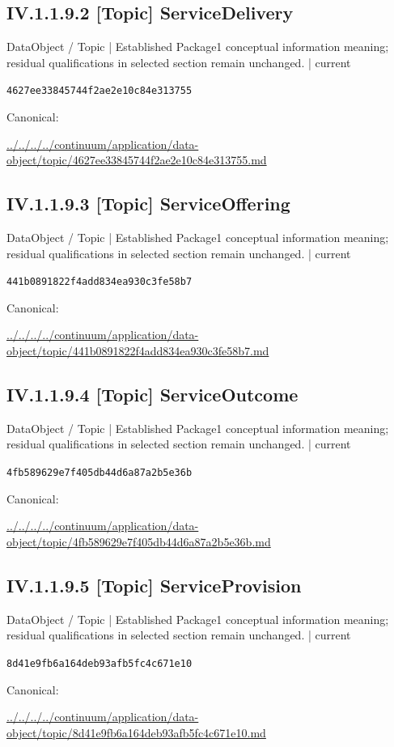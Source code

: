 \documentclass[10pt,a4paper]{article}
\begin{document}
\subsection*{IV.1.1.9.2 [Topic] ServiceDelivery}
{\small DataObject / Topic | Established Package1 conceptual information meaning; residual qualifications in selected section remain unchanged. | current}\par
\texttt{4627ee33845744f2ae2e10c84e313755}\par
Canonical: \par
{\footnotesize\url{../../../../continuum/application/data-object/topic/4627ee33845744f2ae2e10c84e313755.md}}\par
\subsection*{IV.1.1.9.3 [Topic] ServiceOffering}
{\small DataObject / Topic | Established Package1 conceptual information meaning; residual qualifications in selected section remain unchanged. | current}\par
\texttt{441b0891822f4add834ea930c3fe58b7}\par
Canonical: \par
{\footnotesize\url{../../../../continuum/application/data-object/topic/441b0891822f4add834ea930c3fe58b7.md}}\par
\subsection*{IV.1.1.9.4 [Topic] ServiceOutcome}
{\small DataObject / Topic | Established Package1 conceptual information meaning; residual qualifications in selected section remain unchanged. | current}\par
\texttt{4fb589629e7f405db44d6a87a2b5e36b}\par
Canonical: \par
{\footnotesize\url{../../../../continuum/application/data-object/topic/4fb589629e7f405db44d6a87a2b5e36b.md}}\par
\subsection*{IV.1.1.9.5 [Topic] ServiceProvision}
{\small DataObject / Topic | Established Package1 conceptual information meaning; residual qualifications in selected section remain unchanged. | current}\par
\texttt{8d41e9fb6a164deb93afb5fc4c671e10}\par
Canonical: \par
{\footnotesize\url{../../../../continuum/application/data-object/topic/8d41e9fb6a164deb93afb5fc4c671e10.md}}\par
\end{document}
